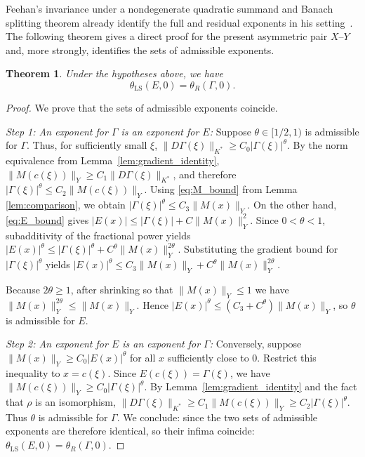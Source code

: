 \documentclass[11pt]{article}
\newtheorem{theorem}{Theorem}[section]
\theoremstyle{definition}
\theoremstyle{remark}
\begin{document}
Feehan's invariance under a nondegenerate quadratic summand and Banach splitting theorem already identify the full and residual exponents in his setting~\cite[Lemma~3.3 and Theorem~5]{Feehan2020}. The following theorem gives a direct proof for the present asymmetric pair $X$--$Y$ and, more strongly, identifies the sets of admissible exponents.


\begin{theorem} \label{thm:exact_reduction}
Under the hypotheses above, we have
$$\theta_{\mathrm{LS}}(E,0) = \theta_R(\Gamma,0).$$
\end{theorem}

\begin{proof}
We prove that the sets of admissible exponents coincide.

{\it Step 1: An exponent for $\Gamma$ is an exponent for $E$: }
Suppose $\theta \in [1/2,1)$ is admissible for $\Gamma$. Thus, for sufficiently small $\xi$, $\|D\Gamma(\xi)\|_{K^*} \ge C_0|\Gamma(\xi)|^{\theta}$. By the norm equivalence from Lemma~\ref{lem:gradient_identity}, $\|M(c(\xi))\|_Y\ge C_1\|D\Gamma(\xi)\|_{K^*}$, and therefore $|\Gamma(\xi)|^\theta\le C_2\|M(c(\xi))\|_Y$. Using \eqref{eq:M_bound} from Lemma \ref{lem:comparison}, we obtain
$|\Gamma(\xi)|^{\theta} \le C_3\|M(x)\|_Y$.
On the other hand, \eqref{eq:E_bound} gives $|E(x)|\le|\Gamma(\xi)|+C\|M(x)\|_Y^2$. Since $0<\theta<1$, subadditivity of the fractional power yields $|E(x)|^\theta\le|\Gamma(\xi)|^\theta+C^\theta\|M(x)\|_Y^{2\theta}$.
Substituting the gradient bound for $|\Gamma(\xi)|^{\theta}$ yields $|E(x)|^{\theta} \le C_3\|M(x)\|_Y + C^{\theta}\|M(x)\|_Y^{2\theta}$.

\smallskip
Because $2\theta\ge1$, after shrinking so that $\|M(x)\|_Y\le1$ we have $\|M(x)\|_Y^{2\theta}\le\|M(x)\|_Y$. Hence $|E(x)|^\theta\le(C_3+C^\theta)\|M(x)\|_Y$, so $\theta$ is admissible for $E$.

\smallskip
{\it Step 2: An exponent for $E$ is an exponent for $\Gamma$: }
Conversely, suppose $\|M(x)\|_Y \ge C_0|E(x)|^{\theta}$ for all $x$ sufficiently close to $0$. Restrict this inequality to $x=c(\xi)$. Since $E(c(\xi))=\Gamma(\xi)$, we have $\|M(c(\xi))\|_Y\ge C_0|\Gamma(\xi)|^\theta$. By Lemma~\ref{lem:gradient_identity} and the fact that $\rho$ is an isomorphism, $\|D\Gamma(\xi)\|_{K^*}\ge C_1\|M(c(\xi))\|_Y\ge C_2|\Gamma(\xi)|^\theta$.
Thus $\theta$ is admissible for $\Gamma$. We conclude: since the two sets of admissible exponents are therefore identical, so their infima coincide: $\theta_{\mathrm{LS}}(E,0) = \theta_R(\Gamma,0)$.
\end{proof}
\end{document}

